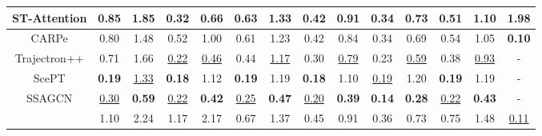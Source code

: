 \documentclass[sigconf]{acmart}
\begin{document}
\begin{table*}[!t]
\begin{adjustbox}{max width = \linewidth,center}
\begin{tabular}{c||cc||cc||cc||cc||cc||cc||c}
\multicolumn{1}{c||}{ST-Attention \cite{zhao2020spatial}} & \multicolumn{1}{c|}{{{0.85}}} & {1.85}     & \multicolumn{1}{c|}{{0.32}} & {{0.66}} & \multicolumn{1}{c|}{{0.63}} & {1.33} & \multicolumn{1}{c|}{{0.42}} & {0.91} & \multicolumn{1}{c|}{{0.34}} & {0.73} & \multicolumn{1}{c|}{{0.51}} & 1.10  & 1.98\\ \hline
\multicolumn{1}{c||}{CARPe \cite{mendieta2021carpe}}        & \multicolumn{1}{c|}{0.80}           & {1.48} & \multicolumn{1}{c|}{0.52}          & 1.00             & \multicolumn{1}{c|}{{0.61}}          &{ 1.23 }         & \multicolumn{1}{c|}{{0.42}}          & {0.84}          & \multicolumn{1}{c|}{{0.34}}          & {0.69}          & \multicolumn{1}{c|}{0.54}          & 1.05   & \textbf{0.10}       \\ \hline
\multicolumn{1}{c||}{Trajectron++ \cite{salzmann2020trajectron++}} & \multicolumn{1}{c|}{{0.71}} & {1.66}          & \multicolumn{1}{c|}{\underline{0.22}} & \underline{0.46} & \multicolumn{1}{c|}{{0.44}} & \underline{1.17} & \multicolumn{1}{c|}{{0.30}} & \underline{0.79} & \multicolumn{1}{c|}{{0.23}} & \underline{0.59} & \multicolumn{1}{c|}{{0.38}} & \underline{{0.93}} & - \\ \hline
\multicolumn{1}{c||}{ScePT \cite{chen2022scept}} & \multicolumn{1}{c|}{\textbf{0.19}} & \underline{1.33}          & \multicolumn{1}{c|}{\textbf{0.18}} & {1.12} & \multicolumn{1}{c|}{\textbf{0.19}} & {1.19} & \multicolumn{1}{c|}{\textbf{0.18}} & {1.10} & \multicolumn{1}{c|}{\underline{0.19}} & {1.20} & \multicolumn{1}{c|}{\textbf{0.19}} & {{1.19}} & - \\ \hline
\multicolumn{1}{c||}{SSAGCN \cite{lv2021ssagcn}} & \multicolumn{1}{c|}{{\underline{0.30}}} & \textbf{0.59}          & \multicolumn{1}{c|}{\underline{0.22}} & {\textbf{0.42}} & \multicolumn{1}{c|}{\underline{0.25}} & \textbf{0.47} & \multicolumn{1}{c|}{\underline{0.20}} & \textbf{0.39} & \multicolumn{1}{c|}{\textbf{0.14}} & \textbf{0.28} & \multicolumn{1}{c|}{\underline{0.22}} & {\textbf{0.43}}  & -\\ \hline
\rowcolor{LightGray}
\multicolumn{1}{c||}{\textbf{Pishgu (Ours)}}       & \multicolumn{1}{c|}{1.10}           & 2.24          & \multicolumn{1}{c|}{1.17}          & 2.17          & \multicolumn{1}{c|}{0.67}          & 1.37          & \multicolumn{1}{c|}{0.45}          & 0.91          & \multicolumn{1}{c|}{0.36}          & 0.73          & \multicolumn{1}{c|}{0.75}          & 1.48 & \underline{0.11} \\ 

\end{tabular}
\end{adjustbox}
\vspace{-10pt}
\end{table*}
\end{document}
